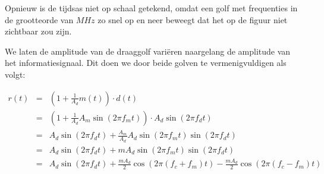 \begin{center}
\end{center}

Opnieuw is de tijdsas niet op schaal getekend, omdat een golf met frequenties in de grootteorde van $MHz$ zo snel op en neer beweegt dat het op de figuur niet zichtbaar zou zijn.

We laten de amplitude van de draaggolf vari\"eren naargelang de amplitude van het informatiesignaal. Dit doen we door beide golven te vermenigvuldigen als volgt:

\begin{eqnarray*}
    r(t) &=& (1 + \frac{1}{A_d} m(t)) \cdot d(t) \\
    &=& \left( 1 + \frac{1}{A_d} A_m \sin(2 \pi f_m t) \right) \cdot A_d \sin(2 \pi f_d t) \\
    &=& A_d \sin(2 \pi f_d t) + \frac{A_m}{A_d} A_d \sin(2 \pi f_m t) \sin(2 \pi f_d t) \\
    &=& A_d \sin(2 \pi f_d t) + m A_d \sin(2 \pi f_m t) \sin(2 \pi f_d t) \\
    &=& A_d \sin(2 \pi f_d t) + \frac{m A_d}{2} \cos(2 \pi (f_c+f_m) t) - \frac{m A_d}{2} \cos(2 \pi (f_c-f_m) t)  \\
\end{eqnarray*}

